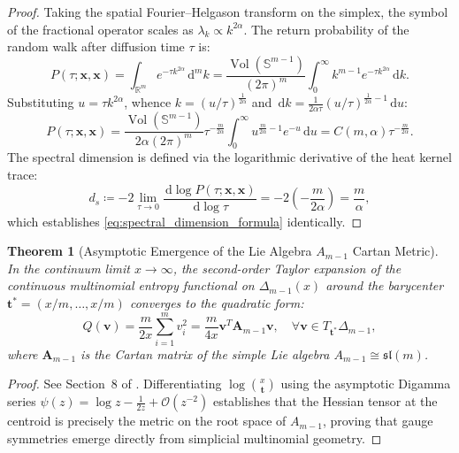 \documentclass[11pt,a4paper,reqno]{amsart}
\newtheorem{theorem}{Theorem}[section]
\theoremstyle{definition}
\numberwithin{equation}{section}
\providecommand{\R}{\mathbb{R}}
\providecommand{\Sph}{\mathbb{S}}
\newcommand{\dif}{\,\mathrm{d}}
\providecommand{\Sph}{\mathbb{S}}
\providecommand{\R}{\mathbb{R}}
\begin{document}
\begin{proof}
Taking the spatial Fourier--Helgason transform on the simplex, the symbol of the fractional operator scales as $\lambda_k \propto k^{2\alpha}$. The return probability of the random walk after diffusion time $\tau$ is:
\begin{equation}
    P(\tau; \mathbf{x}, \mathbf{x}) = \int_{\R^m} e^{-\tau k^{2\alpha}} \dif^m k = \frac{\operatorname{Vol}(\Sph^{m-1})}{(2\pi)^m} \int_0^\infty k^{m-1} e^{-\tau k^{2\alpha}} \dif k.
\end{equation}
Substituting $u = \tau k^{2\alpha}$, whence $k = (u/\tau)^{\frac{1}{2\alpha}}$ and $\dif k = \frac{1}{2\alpha \tau} (u/\tau)^{\frac{1}{2\alpha} - 1} \dif u$:
\begin{equation}
    P(\tau; \mathbf{x}, \mathbf{x}) = \frac{\operatorname{Vol}(\Sph^{m-1})}{2\alpha (2\pi)^m} \tau^{-\frac{m}{2\alpha}} \int_0^\infty u^{\frac{m}{2\alpha} - 1} e^{-u} \dif u = C(m, \alpha) \tau^{-\frac{m}{2\alpha}}.
\end{equation}
The spectral dimension is defined via the logarithmic derivative of the heat kernel trace:
\begin{equation}
    d_s \coloneqq -2 \lim_{\tau \to 0} \frac{\dif \log P(\tau; \mathbf{x}, \mathbf{x})}{\dif \log \tau} = -2 \left( -\frac{m}{2\alpha} \right) = \frac{m}{\alpha},
\end{equation}
which establishes \eqref{eq:spectral_dimension_formula} identically.
\end{proof}

\begin{theorem}[Asymptotic Emergence of the Lie Algebra $A_{m-1}$ Cartan Metric]
\label{thm:cartan_metric_emergence}
In the continuum limit $x \to \infty$, the second-order Taylor expansion of the continuous multinomial entropy functional on $\Delta_{m-1}(x)$ around the barycenter $\mathbf{t}^* = (x/m, \dots, x/m)$ converges to the quadratic form:
\begin{equation}
    \label{eq:cartan_quadratic}
    Q(\mathbf{v}) = \frac{m}{2 x} \sum_{i=1}^m v_i^2 = \frac{m}{4 x} \mathbf{v}^T \mathbf{A}_{m-1} \mathbf{v}, \quad \forall \mathbf{v} \in T_{\mathbf{t}^*} \Delta_{m-1},
\end{equation}
where $\mathbf{A}_{m-1}$ is the Cartan matrix of the simple Lie algebra $A_{m-1} \cong \mathfrak{sl}(m)$.
\end{theorem}
\begin{proof}
See Section~8 of \cite{silvafilho2026pascal}. Differentiating $\log \binom{x}{\mathbf{t}}$ using the asymptotic Digamma series $\psi(z) = \log z - \frac{1}{2z} + \mathcal{O}(z^{-2})$ establishes that the Hessian tensor at the centroid is precisely the metric on the root space of $A_{m-1}$, proving that gauge symmetries emerge directly from simplicial multinomial geometry.
\end{proof}
\end{document}
